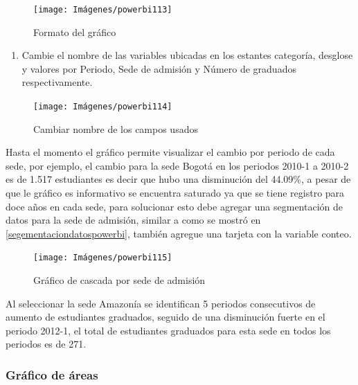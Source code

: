 \documentclass[
]{book}
\providecommand{\tightlist}{%
  \setlength{\itemsep}{0pt}\setlength{\parskip}{0pt}}
\begin{document}
\begin{figure}

{\centering \texttt{[image: Imágenes/powerbi113]} 

}

\caption{Formato del gráfico}\label{fig:paso6cascada-fig}
\end{figure}

\begin{enumerate}
\def\labelenumi{\arabic{enumi}.}
\setcounter{enumi}{6}
\tightlist
\item
  Cambie el nombre de las variables ubicadas en los estantes categoría, desglose y valores por Periodo, Sede de admisión y Número de graduados respectivamente.
\end{enumerate}

\begin{figure}

{\centering \texttt{[image: Imágenes/powerbi114]} 

}

\caption{Cambiar nombre de los campos usados}\label{fig:paso7cascada-fig}
\end{figure}

Hasta el momento el gráfico permite visualizar el cambio por periodo de cada sede, por ejemplo, el cambio para la sede Bogotá en los periodos 2010-1 a 2010-2 es de 1.517 estudiantes es decir que hubo una disminución del 44.09\%, a pesar de que le gráfico es informativo se encuentra saturado ya que se tiene registro para doce años en cada sede, para solucionar esto debe agregar una segmentación de datos para la sede de admisión, similar a como se mostró en \ref{segementaciondatospowerbi}, también agregue una tarjeta con la variable conteo.

\begin{figure}

{\centering \texttt{[image: Imágenes/powerbi115]} 

}

\caption{Gráfico de cascada por sede de admisión}\label{fig:graficocascada-fig}
\end{figure}

Al seleccionar la sede Amazonía se identifican 5 periodos consecutivos de aumento de estudiantes graduados, seguido de una disminución fuerte en el periodo 2012-1, el total de estudiantes graduados para esta sede en todos los periodos es de 271.

\hypertarget{graficodeareaspowerbi}{%
\subsubsection{Gráfico de áreas}\label{graficodeareaspowerbi}}
\end{document}
